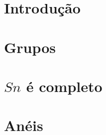 \documentclass[10pt,twoside]{report}
\begin{document}



%

% 

\tableofcontents




\doublespacing
\chapter{Introdução}\label{cap-introducao}


\chapter{Grupos}\label{cap-grupos}


\chapter{\texorpdfstring{$Sn$}{Sn} é completo}\label{cap-Sn}


\chapter{Anéis}\label{cap-aneis}



%

%

{} %

\nocite{*}
\end{document}
